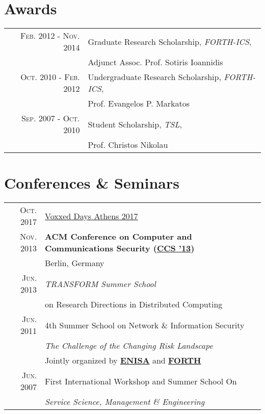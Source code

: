 \documentclass[a4paper,10pt]{article} %
\begin{document}

\section{Awards}

\begin{tabular}{rl}

\textsc{Feb. 2012 - Nov. 2014} & Graduate Research Scholarship, \emph{FORTH-ICS}, \\
& Adjunct Assoc. Prof. Sotiris Ioannidis \\

\textsc{Oct. 2010 - Feb. 2012} & Undergraduate Research Scholarship, \emph{FORTH-ICS}, \\
& Prof. Evangelos P.  Markatos \\


\textsc{Sep. 2007 - Oct. 2010} & Student Scholarship, \emph{TSL}, \\
& Prof. Christos Nikolau \\

\end{tabular}


\section{Conferences \& Seminars}

\begin{tabular}{rl}

\textsc{Oct. 2017} & \href{https://voxxeddays.com/athens17/}{Voxxed Days Athens 2017} \\

\textsc{Nov. 2013} & \textbf{ACM Conference on Computer and Communications Security (\href{http://www.sigsac.org/ccs/CCS2013/}{CCS '13})} \\
& Berlin, Germany \\

\textsc{Jun. 2013} & \emph{TRANSFORM Summer School} \\
& on Research Directions in Distributed Computing \\

\textsc{Jun. 2011} & 4th Summer School on Network \& Information Security \\
& \emph{The Challenge of the Changing Risk Landscape} \\
& \small Jointly organized by \textbf{\href{https://www.enisa.europa.eu/}{ENISA}} and \textbf{\href{https://www.forth.gr/}{FORTH}} \\

\textsc{Jun. 2007} & First International Workshop and Summer School On \\
& \emph{Service Science, Management \& Engineering}

\end{tabular}
\end{document}
